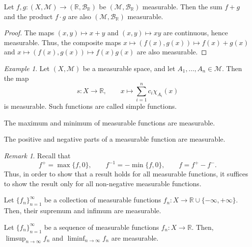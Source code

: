 \documentclass[11pt]{article}
\newcommand{\R}{\mathbb{R}}
\newcommand{\M}{\mathcal{M}}
\theoremstyle{definition}
\theoremstyle{remark}
\newtheorem*{remark}{Remark}
\newtheorem*{example}{Example}
\numberwithin{equation}{section}
\begin{document}
    \begin{corollary}
        Let $f, g\colon (X, \M) \to (\R, \mathcal{B}_\R)$ be $(\M, \mathcal{B}_\R)$
        measurable. Then the sum $f + g$ and the product $f\cdot g$ are also $(\M,
        \mathcal{B}_\R)$ measurable.
    \end{corollary}
    \begin{proof}
        The maps $(x, y) \mapsto x + y$ and $(x, y) \mapsto xy$ are continuous, hence
        measurable. Thus, the composite maps $x \mapsto (f(x), g(x)) \mapsto f(x) +
        g(x)$ and $x \mapsto (f(x), g(x)) \mapsto f(x)g(x)$ are also measurable.
    \end{proof}

    \begin{example}
        Let $(X, \M)$ be a measurable space, and let $A_1, \dots, A_n \in \M$. Then
        the map \[
            s\colon X \to \R, \qquad x \mapsto \sum_{i = 1}^n c_i \chi_{A_i}(x)
        \] is measurable. Such functions are called simple functions.
    \end{example}
    
    \begin{lemma}
        The maximum and minimum of measurable functions are measurable.
    \end{lemma}
    \begin{corollary}
        The positive and negative parts of a measurable function are measurable.
        \begin{remark}
            Recall that \[
                f^+ = \max\{f, 0\}, \qquad f^{-1} = -\min\{f, 0\}, \qquad f = f^+ -
                f^-.
            \] Thus, in order to show that a result holds for all measurable
            functions, it suffices to show the result only for all non-negative
            measurable functions.
        \end{remark}
    \end{corollary}
    

    \begin{theorem}
        Let $\{f_n\}_{n = 1}^\infty$ be a collection of measurable functions
        $f_n\colon X \to \R \cup \{-\infty, +\infty\}$. Then, their supremum and
        infimum are measurable.
    \end{theorem}
    
    \begin{theorem}
        Let $\{f_n\}_{n = 1}^\infty$ be a sequence of measurable functions $f_n\colon
        X \to \R$. Then, $\limsup_{n \to \infty} f_n$ and $\liminf_{n \to \infty}
        f_n$ are measurable.
    \end{theorem}
    
\end{document}
